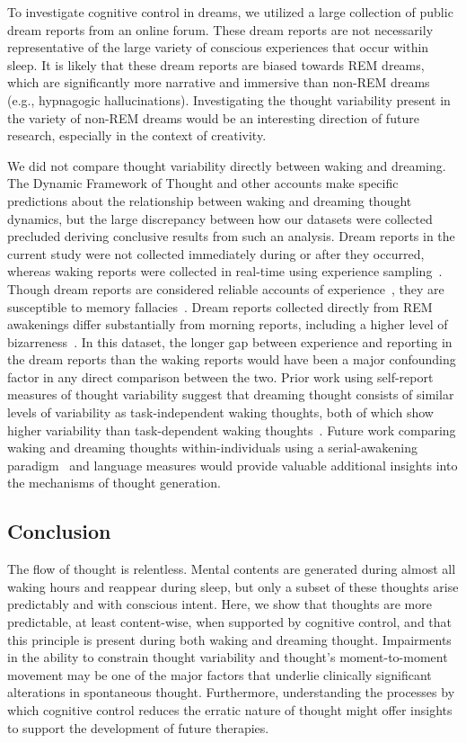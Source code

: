 \documentclass[10pt,a4paper,twocolumn]{article}
\begin{document}
\par
To investigate cognitive control in dreams, we utilized a large collection of public dream reports from an online forum. These dream reports are not necessarily representative of the large variety of conscious experiences that occur within sleep. It is likely that these dream reports are biased towards REM dreams, which are significantly more narrative and immersive than non-REM dreams (e.g., hypnagogic hallucinations). Investigating the thought variability present in the variety of non-REM dreams would be an interesting direction of future research, especially in the context of creativity.

\par
We did not compare thought variability directly between waking and dreaming. The Dynamic Framework of Thought and other accounts make specific predictions about the relationship between waking and dreaming thought dynamics, but the large discrepancy between how our datasets were collected precluded deriving conclusive results from such an analysis. Dream reports in the current study were not collected immediately during or after they occurred, whereas waking reports were collected in real-time using experience sampling~\cite{shiffman2008}. Though dream reports are considered reliable accounts of experience~\cite{windt2013}, they are susceptible to memory fallacies~\cite{rosen2013}. Dream reports collected directly from REM awakenings differ substantially from morning reports, including a higher level of bizarreness~\cite{kirberg2022}. In this dataset, the longer gap between experience and reporting in the dream reports than the waking reports would have been a major confounding factor in any direct comparison between the two. Prior work using self-report measures of thought variability suggest that dreaming thought consists of similar levels of variability as task-independent waking thoughts, both of which show higher variability than task-dependent waking thoughts~\cite{gross2021}. Future work comparing waking and dreaming thoughts within-individuals using a serial-awakening paradigm~\cite{siclari2013} and language measures would provide valuable additional insights into the mechanisms of thought generation.

\subsection*{Conclusion}
The flow of thought is relentless. Mental contents are generated during almost all waking hours and reappear during sleep, but only a subset of these thoughts arise predictably and with conscious intent. Here, we show that thoughts are more predictable, at least content-wise, when supported by cognitive control, and that this principle is present during both waking and dreaming thought. Impairments in the ability to constrain thought variability and thought's moment-to-moment movement may be one of the major factors that underlie clinically significant alterations in spontaneous thought. Furthermore, understanding the processes by which cognitive control reduces the erratic nature of thought might offer insights to support the development of future therapies.
\end{document}
